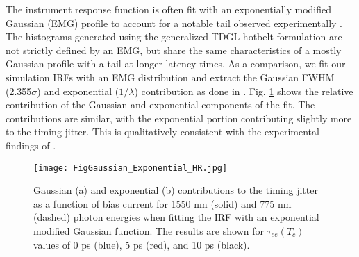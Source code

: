 \documentclass[%
reprint,
 amsmath,amssymb,
aps,
pra,
]{revtex4-1}
\begin{document}
\quad The instrument response function is often fit with an exponentially modified Gaussian (EMG) profile to account for a notable tail observed experimentally \cite{najafi_timing_2015,sidorova_physical_2017,korzh_demonstrating_2018}.  The histograms generated using the generalized TDGL hotbelt formulation are not strictly defined by an EMG, but share the same characteristics of a mostly Gaussian profile with a tail at longer latency times.  As a comparison, we fit our simulation IRFs with an EMG distribution and extract the Gaussian FWHM (2.355\(\sigma\)) and exponential (\(1/\lambda\)) contribution as done in \cite{korzh_demonstrating_2018}.  Fig. \ref{F Gaussian Exp} shows the relative contribution of the Gaussian and exponential components of the fit.  The contributions are similar, with the exponential portion contributing slightly more to the timing jitter.  This is qualitatively consistent with the experimental findings of \cite{korzh_demonstrating_2018}.

\begin{figure}
\texttt{[image: FigGaussian\_Exponential\_HR.jpg]}
\caption{Gaussian (a) and exponential (b) contributions to the timing jitter as a function of bias current for 1550 nm (solid) and 775 nm (dashed) photon energies when fitting the IRF with an exponential modified Gaussian function.  The results are shown for \(\tau_{ee}\left(T_c\right) \) values of 0 ps (blue), 5 ps (red), and 10 ps (black). 
}
\label{F Gaussian Exp}
\end{figure}
\end{document}
